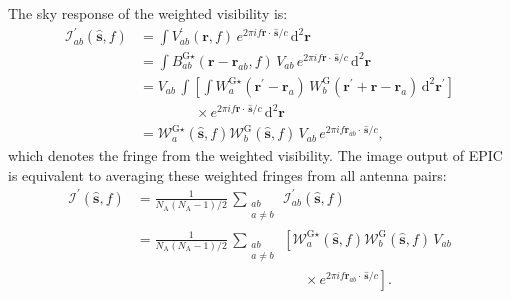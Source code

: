 \documentclass[a4paper,fleqn,usenatbib]{mnras}
\newcommand{\Nant}{N_\textrm{A}}
\newcommand{\dif}{\mathrm{d}}
\begin{document}
The sky response of the weighted visibility is:
\begin{align}
  \mathcal{I}^\prime_{ab}(\hat{\mathbf{s}},f) &= \int V^\prime_{ab}(\mathbf{r},f)\,e^{2\pi i f\mathbf{r}\cdot\,\hat{\mathbf{s}}/c}\,\dif^2\mathbf{r} \nonumber\\
                                              &= \int B^{\textrm{G}\star}_{ab}(\mathbf{r}-\mathbf{r}_{ab},f)\,V_{ab}\,e^{2\pi i f\mathbf{r}\cdot\,\hat{\mathbf{s}}/c}\,\dif^2\mathbf{r} \nonumber\\
                                              &= V_{ab}\,\int \left[\int W^{\textrm{G}\star}_a(\mathbf{r}^\prime-\mathbf{r}_a)\,W^\textrm{G}_b(\mathbf{r}^\prime+\mathbf{r}-\mathbf{r}_a)\,\dif^2\mathbf{r}^\prime\right] \nonumber\\
                                              &\qquad\qquad \times e^{2\pi i f\mathbf{r}\cdot\,\hat{\mathbf{s}}/c}\,\dif^2\mathbf{r} \nonumber\\
                                              &= \mathcal{W}^{\textrm{G}\star}_a(\hat{\mathbf{s}},f)\mathcal{W}^\textrm{G}_b(\hat{\mathbf{s}},f)\,V_{ab}\,e^{2\pi i f\mathbf{r}_{ab}\!\cdot\,\hat{\mathbf{s}}/c},
\end{align}
which denotes the fringe from the weighted visibility. The image output of EPIC is equivalent to averaging these weighted fringes from all antenna pairs:
\begin{align}\label{eqn:wt-dirty-image-EPIC}
  \mathcal{I}^\prime(\hat{\mathbf{s}},f) &= \frac{1}{\Nant(\Nant-1)/2}\,\sum_{\substack{ab\\a\ne b}}\,\mathcal{I}^\prime_{ab}(\hat{\mathbf{s}},f) \nonumber\\
                                         &= \frac{1}{\Nant(\Nant-1)/2}\,\sum_{\substack{ab\\a\ne b}}\,\left[\mathcal{W}^{\textrm{G}\star}_a(\hat{\mathbf{s}},f)\mathcal{W}^\textrm{G}_b(\hat{\mathbf{s}},f)\,V_{ab}\right. \nonumber\\
  &\qquad\qquad\qquad\qquad\qquad\qquad \times \left. e^{2\pi i f\mathbf{r}_{ab}\!\cdot\,\hat{\mathbf{s}}/c}\right].
\end{align}
\end{document}
